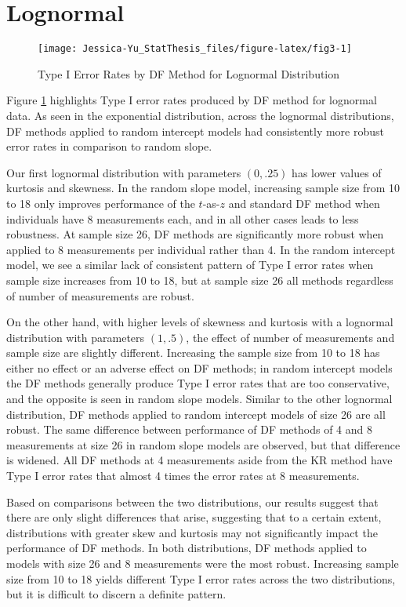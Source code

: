\documentclass[12pt, twoside]{amherstthesis}
\begin{document}
\hypertarget{lognormal}{%
\section{Lognormal}\label{lognormal}}
\begin{figure}

{\centering \texttt{[image: Jessica-Yu\_StatThesis\_files/figure-latex/fig3-1]} 

}

\caption{Type I Error Rates by DF Method for Lognormal Distribution}\label{fig:fig3}
\end{figure}
Figure \ref{fig:fig3} highlights Type I error rates produced by DF method for lognormal data. As seen in the exponential distribution, across the lognormal distributions, DF methods applied to random intercept models had consistently more robust error rates in comparison to random slope.

Our first lognormal distribution with parameters \((0,.25)\) has lower values of kurtosis and skewness. In the random slope model, increasing sample size from 10 to 18 only improves performance of the \(t\)-as-\(z\) and standard DF method when individuals have 8 measurements each, and in all other cases leads to less robustness. At sample size 26, DF methods are significantly more robust when applied to 8 measurements per individual rather than 4. In the random intercept model, we see a similar lack of consistent pattern of Type I error rates when sample size increases from 10 to 18, but at sample size 26 all methods regardless of number of measurements are robust.

On the other hand, with higher levels of skewness and kurtosis with a lognormal distribution with parameters \((1,.5)\), the effect of number of measurements and sample size are slightly different. Increasing the sample size from 10 to 18 has either no effect or an adverse effect on DF methods; in random intercept models the DF methods generally produce Type I error rates that are too conservative, and the opposite is seen in random slope models. Similar to the other lognormal distribution, DF methods applied to random intercept models of size 26 are all robust. The same difference between performance of DF methods of 4 and 8 measurements at size 26 in random slope models are observed, but that difference is widened. All DF methods at 4 measurements aside from the KR method have Type I error rates that almost 4 times the error rates at 8 measurements.

Based on comparisons between the two distributions, our results suggest that there are only slight differences that arise, suggesting that to a certain extent, distributions with greater skew and kurtosis may not significantly impact the performance of DF methods. In both distributions, DF methods applied to models with size 26 and 8 measurements were the most robust. Increasing sample size from 10 to 18 yields different Type I error rates across the two distributions, but it is difficult to discern a definite pattern.
\end{document}
